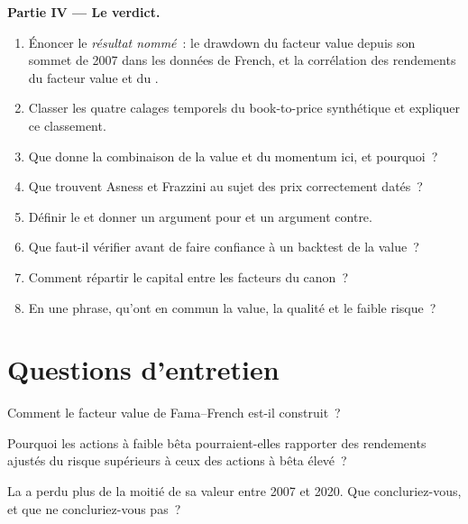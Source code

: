 \begin{problem}
\medskip\noindent\textbf{Partie IV --- Le verdict.}
\begin{enumerate}[resume]
\item Énoncer le \emph{résultat nommé}~: le drawdown du facteur value depuis son sommet de 2007 dans les données de French, et la corrélation des rendements du facteur value et du .
\item Classer les quatre calages temporels du book-to-price synthétique et expliquer ce classement.
\item Que donne la combinaison de la value et du momentum ici, et pourquoi~?
\item Que trouvent Asness et Frazzini au sujet des prix correctement datés~?
\item Définir le  et donner un argument pour et un argument contre.
\item Que faut-il vérifier avant de faire confiance à un backtest de la value~?
\item Comment répartir le capital entre les facteurs du canon~?
\item En une phrase, qu'ont en commun la value, la qualité et le faible risque~?
\end{enumerate}
\end{problem}

\section{Questions d'entretien}

\begin{interviewq}\label{iq:s1:value-quality-and-low-risk:1}
Comment le facteur value de Fama--French est-il construit~?
\end{interviewq}

\begin{interviewq}\label{iq:s1:value-quality-and-low-risk:2}
Pourquoi les actions à faible bêta pourraient-elles rapporter des rendements ajustés du risque supérieurs à ceux des actions à bêta élevé~?
\end{interviewq}

\begin{interviewq}\label{iq:s1:value-quality-and-low-risk:3}
La  a perdu plus de la moitié de sa valeur entre 2007 et 2020. Que concluriez-vous, et que ne concluriez-vous pas~?
\end{interviewq}

